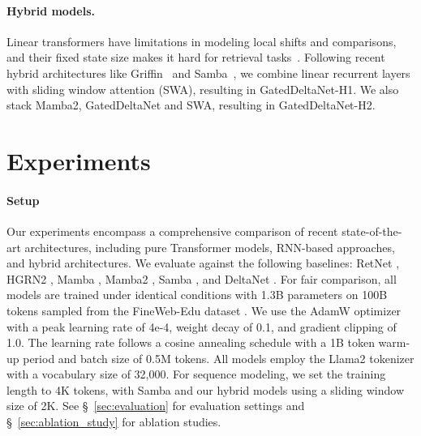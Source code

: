 \documentclass{article}
\begin{document}
\paragraph{Hybrid models.} Linear transformers have limitations in modeling local shifts and comparisons, and their fixed state size makes it hard for retrieval tasks~\citep{arora_simple_2024}. Following recent hybrid architectures like Griffin~\citep{de_griffin_2024} and Samba~\citep{ren2024samba}, we combine linear recurrent layers with sliding window attention (SWA), resulting in GatedDeltaNet-H1. We also stack Mamba2, GatedDeltaNet and SWA, resulting in GatedDeltaNet-H2.
\section{Experiments}
\label{sec:exp}
\paragraph{Setup}
\label{sec:setup}
Our experiments encompass a comprehensive comparison of recent state-of-the-art architectures, including pure Transformer models, RNN-based approaches, and hybrid architectures. We evaluate against the following baselines: RetNet \citep{sun2023retentive}, HGRN2 \citep{qin2024hgrn2}, Mamba \citep{gu_mamba_2023}, Mamba2 \citep{pmlr-v235-dao24a}, Samba \citep{ren2024samba}, and DeltaNet \citep{yang2024parallelizing}.
For fair comparison, all models are trained under identical conditions with 1.3B parameters on 100B tokens sampled from the FineWeb-Edu dataset \citep{penedo2024fineweb}. We use the AdamW optimizer with a peak learning rate of 4e-4, weight decay of 0.1, and gradient clipping of 1.0. The learning rate follows a cosine annealing schedule with a 1B token warm-up period and batch size of 0.5M tokens. All models employ the Llama2 tokenizer with a vocabulary size of 32,000. For sequence modeling, we set the training length to 4K tokens, with Samba and our hybrid models using a sliding window size of 2K.  See \S~\ref{sec:evaluation} for evaluation settings  and \S~\ref{sec:ablation_study} for ablation studies.
\end{document}
